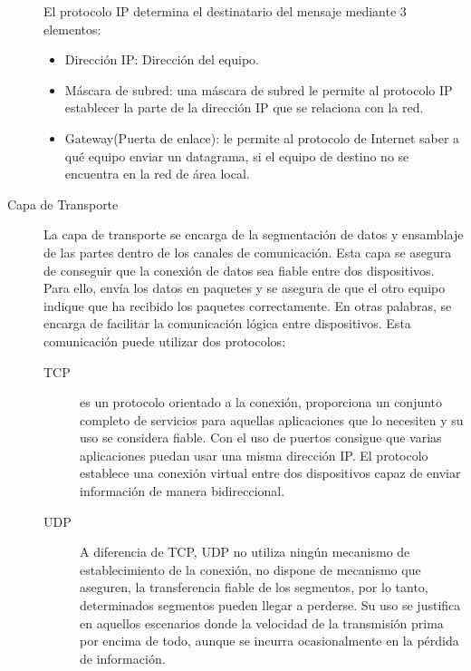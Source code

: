 \begin{description}
El protocolo IP determina el destinatario del mensaje mediante 3 elementos:
\begin{itemize}
\item Dirección IP: Dirección del equipo.
\item Máscara de subred: una máscara de subred le permite al protocolo IP establecer la parte de la dirección IP que se relaciona con la red.
\item Gateway(Puerta de enlace): le permite al protocolo de Internet saber a qué equipo enviar un datagrama, si el equipo de destino no se encuentra en la red de área local.
\end{itemize}

\item[Capa de Transporte]
La capa de transporte \cite{capaTransporte} se encarga de la segmentación de datos y ensamblaje de las partes dentro de los canales de comunicación. Esta capa se asegura de conseguir que la conexión de datos sea fiable entre dos dispositivos. Para ello, envía los datos en paquetes y se asegura de que el otro equipo indique que ha recibido los paquetes correctamente. En otras palabras, se encarga de facilitar la comunicación lógica entre dispositivos. Esta comunicación puede utilizar dos protocolos:
	\begin{description}
	\item[TCP] es un protocolo orientado a la conexión, proporciona un conjunto completo de servicios para aquellas aplicaciones que lo necesiten y su uso se considera fiable. Con el uso de puertos consigue que varias aplicaciones puedan usar una misma dirección IP. El protocolo establece una conexión virtual entre dos dispositivos capaz de enviar información de manera bidireccional. 
	\item[UDP] A diferencia de TCP, UDP no utiliza ningún mecanismo de establecimiento de la conexión, no dispone de mecanismo que aseguren, la transferencia fiable de los segmentos, por lo tanto, determinados segmentos pueden llegar a perderse. Su uso se justifica en aquellos escenarios donde la velocidad de la transmisión prima por encima de todo, aunque se incurra ocasionalmente en la pérdida de información.
	\end{description}


\end{description}
